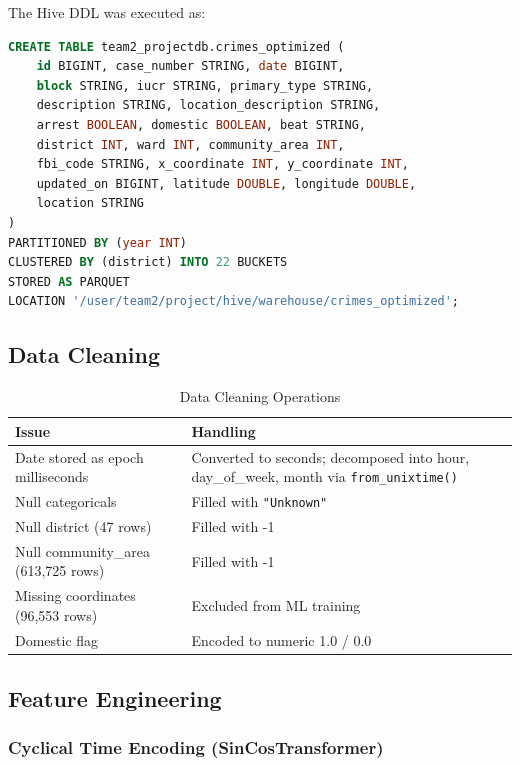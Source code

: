 The Hive DDL was executed as:

\begin{lstlisting}[language=SQL, caption={Hive table creation}]
CREATE TABLE team2_projectdb.crimes_optimized (
    id BIGINT, case_number STRING, date BIGINT,
    block STRING, iucr STRING, primary_type STRING,
    description STRING, location_description STRING,
    arrest BOOLEAN, domestic BOOLEAN, beat STRING,
    district INT, ward INT, community_area INT,
    fbi_code STRING, x_coordinate INT, y_coordinate INT,
    updated_on BIGINT, latitude DOUBLE, longitude DOUBLE,
    location STRING
)
PARTITIONED BY (year INT)
CLUSTERED BY (district) INTO 22 BUCKETS
STORED AS PARQUET
LOCATION '/user/team2/project/hive/warehouse/crimes_optimized';
\end{lstlisting}

\subsection{Data Cleaning}

\begin{table}[H]
\centering
\caption{Data Cleaning Operations}
\label{tab:cleaning}
\begin{tabularx}{\textwidth}{lX}
\toprule
\textbf{Issue} & \textbf{Handling} \\
\midrule
Date stored as epoch milliseconds & Converted to seconds; decomposed into hour, day\_of\_week, month via \texttt{from\_unixtime()} \\
Null categoricals & Filled with \texttt{"Unknown"} \\
Null district (47 rows) & Filled with -1 \\
Null community\_area (613,725 rows) & Filled with -1 \\
Missing coordinates (96,553 rows) & Excluded from ML training \\
Domestic flag & Encoded to numeric 1.0 / 0.0 \\
\bottomrule
\end{tabularx}
\end{table}

\subsection{Feature Engineering}

\subsubsection{Cyclical Time Encoding (SinCosTransformer)}

